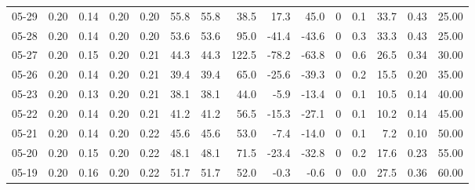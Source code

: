 \begin{threeparttable}
{\begin{tabular}{lrrrrrrrrrrrrrr}
  05-29 &          0.20 &          0.14 &          0.20 &        0.20 &                55.8 &               55.8 &                38.5 &       17.3 &         45.0 &              0 &                 0.1 &             33.7 &            0.43 &                  25.00 \\
  05-28 &          0.20 &          0.14 &          0.20 &        0.20 &                53.6 &               53.6 &                95.0 &      -41.4 &        -43.6 &              0 &                 0.3 &             33.3 &            0.43 &                  25.00 \\
  05-27 &          0.20 &          0.15 &          0.20 &        0.21 &                44.3 &               44.3 &               122.5 &      -78.2 &        -63.8 &              0 &                 0.6 &             26.5 &            0.34 &                  30.00 \\
  05-26 &          0.20 &          0.14 &          0.20 &        0.21 &                39.4 &               39.4 &                65.0 &      -25.6 &        -39.3 &              0 &                 0.2 &             15.5 &            0.20 &                  35.00 \\
  05-23 &          0.20 &          0.13 &          0.20 &        0.21 &                38.1 &               38.1 &                44.0 &       -5.9 &        -13.4 &              0 &                 0.1 &             10.5 &            0.14 &                  40.00 \\
  05-22 &          0.20 &          0.14 &          0.20 &        0.21 &                41.2 &               41.2 &                56.5 &      -15.3 &        -27.1 &              0 &                 0.1 &             10.2 &            0.14 &                  45.00 \\
  05-21 &          0.20 &          0.14 &          0.20 &        0.22 &                45.6 &               45.6 &                53.0 &       -7.4 &        -14.0 &              0 &                 0.1 &              7.2 &            0.10 &                  50.00 \\
  05-20 &          0.20 &          0.15 &          0.20 &        0.22 &                48.1 &               48.1 &                71.5 &      -23.4 &        -32.8 &              0 &                 0.2 &             17.6 &            0.23 &                  55.00 \\
  05-19 &          0.20 &          0.16 &          0.20 &        0.22 &                51.7 &               51.7 &                52.0 &       -0.3 &         -0.6 &              0 &                 0.0 &             27.5 &            0.36 &                  60.00 \\

\end{tabular}}
\end{threeparttable}
